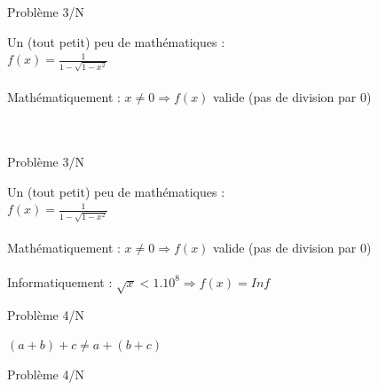 \documentclass{beamer}
\begin{document}
    \begin{frame}{Problème 3/N} 
    \begin{center}
    Un (tout petit) peu de mathématiques : \\
      $f(x) = \frac{1}{1-\sqrt{1-x^{2}}}$ \\
      \textcolor{white}{ } \\
      Mathématiquement : $x \neq 0 \Rightarrow f(x)$ valide (pas de division par 0) \\
      \textcolor{white}{ } \\
      \textcolor{white}{ } \\
     \end{center}
  \end{frame}

    \begin{frame}{Problème 3/N} 
    \begin{center}
    Un (tout petit) peu de mathématiques : \\
      $f(x) = \frac{1}{1-\sqrt{1-x^{2}}}$ \\
      \textcolor{white}{ } \\
      Mathématiquement : $x \neq 0 \Rightarrow f(x)$ valide (pas de division par 0) \\
      \textcolor{white}{ } \\
      Informatiquement : $\sqrt{x} < 1.10^{8} \Rightarrow f(x) = Inf$
     \end{center}
  \end{frame}
  
  
  \begin{frame}{Problème 4/N} 
  \begin{center}
  $(a+b)+c \neq a+(b+c)$ \\
  \end{center}
  \end{frame}
  
  \begin{frame}{Problème 4/N} 
  \randomassociativity
  \end{frame}
  
\end{document}
